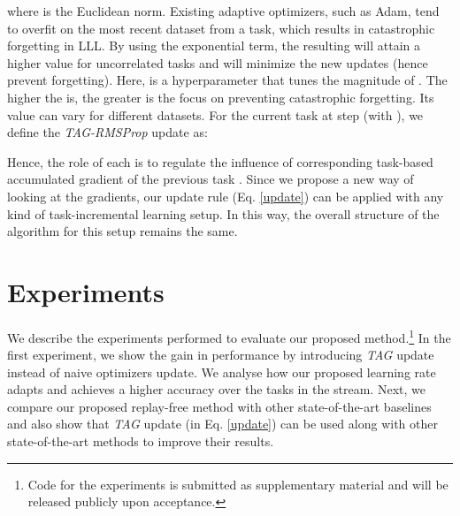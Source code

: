 \documentclass{article} \usepackage{collas2022_conference,times}
\begin{document}
    where  is the Euclidean norm. Existing adaptive optimizers, such as Adam, tend to overfit on the most recent dataset from a task, which results in catastrophic forgetting in LLL. By using the exponential term, the resulting  will attain a higher value for uncorrelated tasks and will minimize the new updates (hence prevent forgetting). 
    Here,  is a hyperparameter that tunes the magnitude of . The higher the  is, the greater is the focus on preventing catastrophic forgetting. Its value can vary for different datasets. For the current task  at step  (with ), we define the \textit{TAG-RMSProp} update as:

    





    Hence, the role of each  is to regulate the influence of corresponding task-based accumulated gradient  of the previous task . Since we propose a new way of looking at the gradients, our update rule (Eq. \ref{update}) can be applied with any kind of task-incremental learning setup. In this way, the overall structure of the algorithm for this setup remains the same.



\section{Experiments}\label{exp_sec}

We describe the experiments performed to evaluate our proposed method.\footnote{Code for the experiments is submitted as supplementary material and will be released publicly upon acceptance.} 
In the first experiment, we show the gain in performance by introducing \textit{TAG} update instead of naive optimizers update. We analyse how our proposed learning rate adapts and achieves a higher accuracy over the tasks in the stream. Next, we compare our proposed replay-free method with other state-of-the-art baselines and also show that \textit{TAG} update (in Eq. \ref{update}) can be used along with other state-of-the-art methods to improve their results. 
\end{document}
